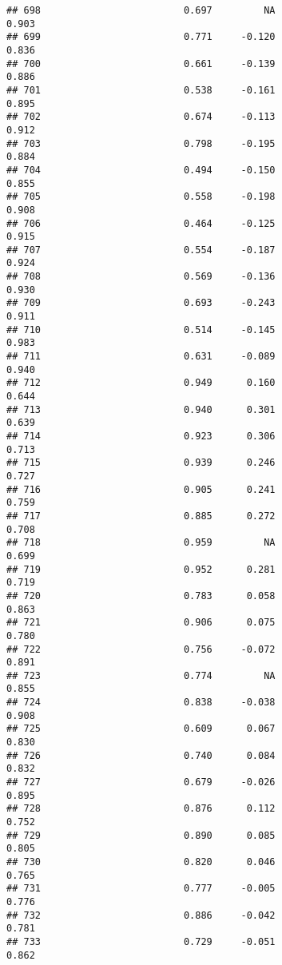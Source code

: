 \documentclass[
]{article}
\begin{document}
\begin{verbatim}
## 698                         0.697         NA                     0.903
## 699                         0.771     -0.120                     0.836
## 700                         0.661     -0.139                     0.886
## 701                         0.538     -0.161                     0.895
## 702                         0.674     -0.113                     0.912
## 703                         0.798     -0.195                     0.884
## 704                         0.494     -0.150                     0.855
## 705                         0.558     -0.198                     0.908
## 706                         0.464     -0.125                     0.915
## 707                         0.554     -0.187                     0.924
## 708                         0.569     -0.136                     0.930
## 709                         0.693     -0.243                     0.911
## 710                         0.514     -0.145                     0.983
## 711                         0.631     -0.089                     0.940
## 712                         0.949      0.160                     0.644
## 713                         0.940      0.301                     0.639
## 714                         0.923      0.306                     0.713
## 715                         0.939      0.246                     0.727
## 716                         0.905      0.241                     0.759
## 717                         0.885      0.272                     0.708
## 718                         0.959         NA                     0.699
## 719                         0.952      0.281                     0.719
## 720                         0.783      0.058                     0.863
## 721                         0.906      0.075                     0.780
## 722                         0.756     -0.072                     0.891
## 723                         0.774         NA                     0.855
## 724                         0.838     -0.038                     0.908
## 725                         0.609      0.067                     0.830
## 726                         0.740      0.084                     0.832
## 727                         0.679     -0.026                     0.895
## 728                         0.876      0.112                     0.752
## 729                         0.890      0.085                     0.805
## 730                         0.820      0.046                     0.765
## 731                         0.777     -0.005                     0.776
## 732                         0.886     -0.042                     0.781
## 733                         0.729     -0.051                     0.862

\end{verbatim}
\end{document}
